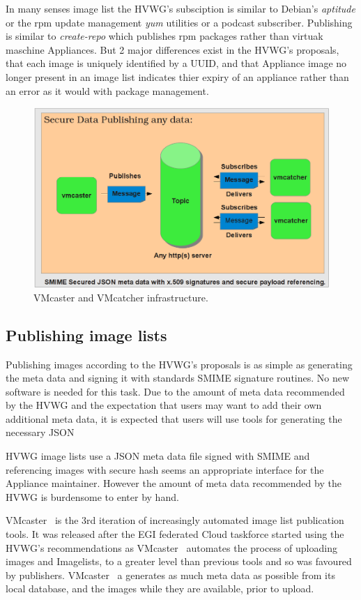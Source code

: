 \documentclass{llncs_Ibergrid2013}
\begin{document}
In many senses image list the HVWG's subsciption is similar to Debian's \textit{aptitude} or the rpm update management \textit{yum} utilities or a podcast subscriber. Publishing is similar to \textit{create-repo} which publishes rpm packages rather than virtuak maschine Appliances. But 2 major differences exist in the HVWG's proposals, that each image is uniquely identified by a UUID, and that Appliance image no longer present in an image list indicates thier expiry of an appliance rather than an error as it would with package management.
\begin{figure}[h]
\centering
\includegraphics[width=1\textwidth]{vmcaster_vmcatcher.png}
\caption{VMcaster and VMcatcher infrastructure.}
\label{fig:infrastructure}
\end{figure}

\subsection{Publishing image lists}
Publishing images according to the HVWG's proposals is as simple as generating the meta data and signing it with standards SMIME signature routines. No new software is needed for this task. Due to the amount of meta data recommended by the HVWG and the expectation that users may want to add their own additional meta data, it is expected that users will use tools for generating the necessary JSON 

HVWG image lists use a JSON meta data file signed with SMIME and referencing images with secure hash seems an appropriate interface for the Appliance maintainer. However the amount of meta data recommended by the HVWG is burdensome to enter by hand.
 
VMcaster~\cite{vmcaster} is the 3rd iteration of increasingly automated image list publication tools. It was released after the EGI federated Cloud taskforce started using the HVWG's recommendations as VMcaster~\cite{vmcaster} automates the process of uploading images and Imagelists, to a greater level than previous tools and so was favoured by publishers. VMcaster~\cite{vmcaster} a generates as much meta data as possible from its local database, and the images while they are available, prior to upload.
\end{document}
